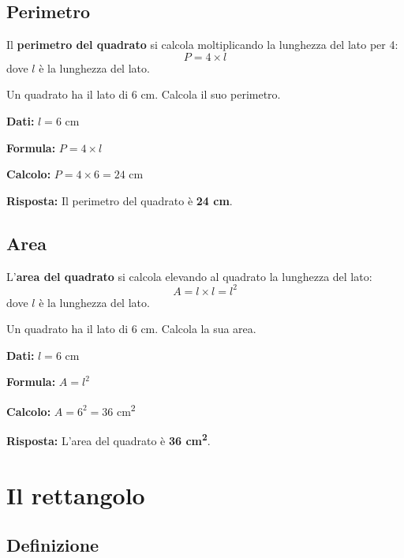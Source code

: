 \subsection{Perimetro}

\begin{regola}
    Il \textbf{perimetro del quadrato} si calcola moltiplicando la lunghezza del lato per 4:
    \[
        P = 4 \times l
    \]
    dove $l$ è la lunghezza del lato.
\end{regola}

\begin{esempio}
    Un quadrato ha il lato di 6 cm. Calcola il suo perimetro.

    \medskip
    \textbf{Dati:} $l = 6$ cm

    \textbf{Formula:} $P = 4 \times l$

    \textbf{Calcolo:} $P = 4 \times 6 = 24$ cm

    \textbf{Risposta:} Il perimetro del quadrato è \textbf{24 cm}.
\end{esempio}

\subsection{Area}

\begin{regola}
    L'\textbf{area del quadrato} si calcola elevando al quadrato la lunghezza del lato:
    \[
        A = l \times l = l^2
    \]
    dove $l$ è la lunghezza del lato.
\end{regola}

\begin{esempio}
    Un quadrato ha il lato di 6 cm. Calcola la sua area.

    \medskip
    \textbf{Dati:} $l = 6$ cm

    \textbf{Formula:} $A = l^2$

    \textbf{Calcolo:} $A = 6^2 = 36$ cm\textsuperscript{2}

    \textbf{Risposta:} L'area del quadrato è \textbf{36 cm\textsuperscript{2}}.
\end{esempio}

\section{Il rettangolo}

\subsection{Definizione}

